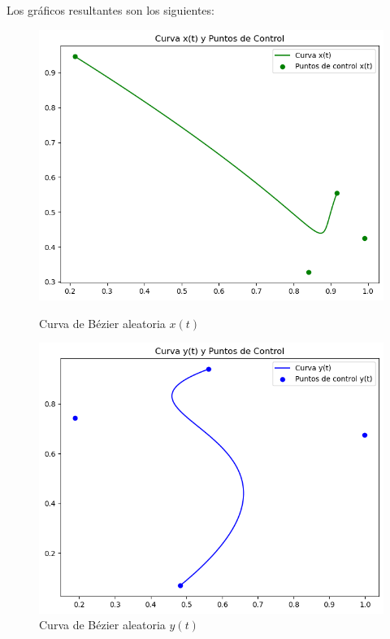 \documentclass{article}
\begin{document}
Los gráficos resultantes son los siguientes: 

\begin{figure}[H]
   \centering
    \begin{minipage}{0.45\textwidth}
        \centering
        \includegraphics[width=\textwidth]{imagenes/6a1.png}
        \caption{Curva de Bézier aleatoria $x(t)$}
        \label{fig:grafico1}
    \end{minipage}
    \hfill
    \begin{minipage}{0.45\textwidth}
        \centering
        \includegraphics[width=\textwidth]{imagenes/6a2.png}
        \caption{Curva de Bézier aleatoria $y(t)$}

\end{minipage}
\end{figure}
\end{document}
